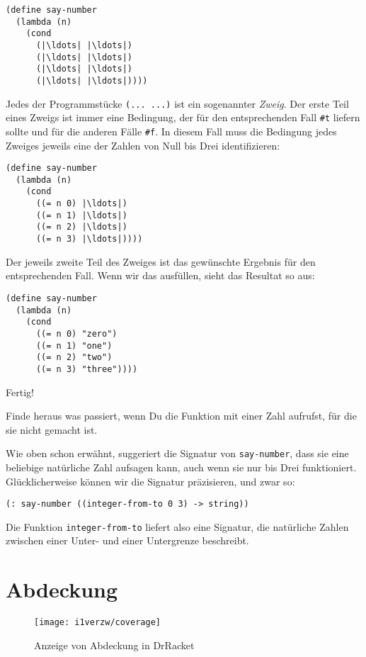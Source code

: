 \begin{lstlisting}
(define say-number
  (lambda (n)
    (cond
      (|\ldots| |\ldots|)
      (|\ldots| |\ldots|)
      (|\ldots| |\ldots|)
      (|\ldots| |\ldots|))))
\end{lstlisting}
%
Jedes der Programmstücke \lstinline{(... ...)} ist ein sogenannter
\textit{Zweig}.  Der erste Teil eines Zweigs ist immer
eine Bedingung, der für den entsprechenden Fall \lstinline{#t} liefern
sollte und für die anderen Fälle \lstinline{#f}.  In diesem Fall muss die
Bedingung jedes Zweiges jeweils eine der Zahlen von Null bis Drei
identifizieren:
%
\begin{lstlisting}
(define say-number
  (lambda (n)
    (cond
      ((= n 0) |\ldots|)
      ((= n 1) |\ldots|)
      ((= n 2) |\ldots|)
      ((= n 3) |\ldots|))))
\end{lstlisting}
%
Der jeweils zweite Teil des Zweiges ist das gewünschte Ergebnis für
den entsprechenden Fall.  Wenn wir das ausfüllen, sieht das Resultat
so aus:
%
\begin{lstlisting}
(define say-number
  (lambda (n)
    (cond
      ((= n 0) "zero")
      ((= n 1) "one")
      ((= n 2) "two")
      ((= n 3) "three"))))
\end{lstlisting}
%
Fertig!
\begin{aufgabeinline}
  Finde heraus was passiert, wenn Du die Funktion mit einer Zahl
  aufrufst, für die sie nicht gemacht ist.
\end{aufgabeinline}
%
Wie oben schon erwähnt, suggeriert die Signatur von
\lstinline{say-number}, dass sie eine beliebige natürliche Zahl
aufsagen kann, auch wenn sie nur bis Drei funktioniert.
Glücklicherweise können wir die Signatur präzisieren, und zwar so:
%
\begin{lstlisting}
(: say-number ((integer-from-to 0 3) -> string))
\end{lstlisting}
%
Die Funktion
\lstinline{integer-from-to}
liefert also eine Signatur, die natürliche Zahlen zwischen einer Unter-
und einer Untergrenze beschreibt.\label{function:integer-from-to}

\section{Abdeckung}
\label{sec:testabdeckung}

\begin{figure}[tb]
  \centering
  \texttt{[image: i1verzw/coverage]}
  \caption{Anzeige von Abdeckung in DrRacket}
  \label{fig:coverage}
\end{figure}

